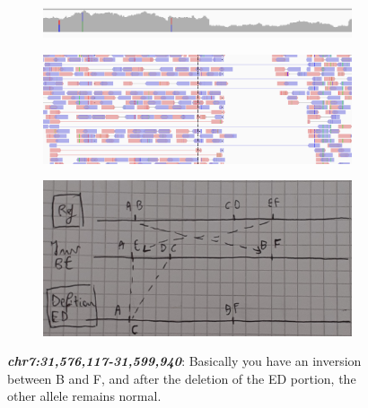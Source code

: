 \begin{figure}[H]
    \centering
    \begin{subfigure}[t]{0.6\textwidth}
        \centering
        \includegraphics[width=1\textwidth]{cov3.PNG}
    \end{subfigure}
    \begin{subfigure}[t]{0.6\textwidth}
        \centering
        \includegraphics[width=1\textwidth]{pos3.PNG}
    \end{subfigure}
    \hfill
    \begin{subfigure}[t]{0.6\textwidth}
        \centering
        \includegraphics[width=1\textwidth]{pos3passages.jpg}
    \end{subfigure}
    \caption{\textit{\textbf{chr7:31,576,117-31,599,940}}: Basically you have an inversion between B and F, and after the deletion of the ED portion, the other allele remains normal.}
    \label{fig:3}
\end{figure}


